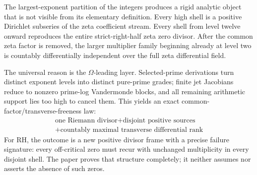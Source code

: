 \documentclass[11pt]{article}
\theoremstyle{definition}
\theoremstyle{remark}
\begin{document}
The largest-exponent partition of the integers produces a rigid analytic object that is not
visible from its elementary definition.  Every high shell is a positive Dirichlet subseries of
the zeta coefficient stream.  Every shell from level twelve onward reproduces the entire
strict-right-half zeta zero divisor.  After the common zeta factor is removed, the larger
multiplier family beginning already at level two is countably differentially independent over
the full zeta differential field.

The universal reason is the \(\Omega\)-leading layer.  Selected-prime derivations turn distinct
exponent levels into distinct pure-prime grades; finite jet Jacobians reduce to nonzero
prime-log Vandermonde blocks, and all remaining arithmetic support lies too high to cancel
them.  This yields an exact common-factor/transverse-freeness law:
\[
\boxed{\begin{gathered}
 \text{one Riemann divisor}+\text{disjoint positive sources}\\
 {}+\text{countably maximal transverse differential rank}
\end{gathered}}
\]
For RH, the outcome is a new positive divisor frame with a precise failure signature:
every off-critical zero must recur with unchanged multiplicity in every disjoint shell.  The
paper proves that structure completely; it neither assumes nor asserts the absence of such
zeros.
\end{document}
